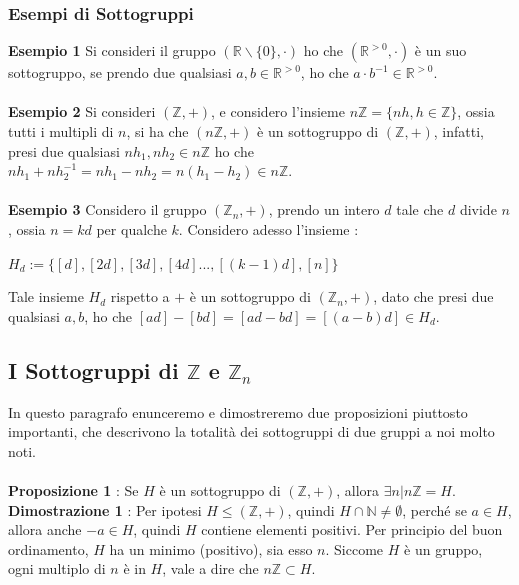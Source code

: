 \documentclass[12pt, letterpaper]{article}
\begin{document}
\subsubsection{Esempi di Sottogruppi}
\textbf{Esempio 1} Si consideri il gruppo \((\mathbb{R}\backslash\{0\},\cdot)\) ho che  \((\mathbb{R}^{>0},\cdot)\) è 
un suo sottogruppo, se prendo due qualsiasi \(a,b\in \mathbb{R}^{>0}\), ho che \(a\cdot b^{-1}\in \mathbb{R}^{>0}\).
\\\hphantom{}\\
\textbf{Esempio 2} Si consideri \((\mathbb{Z},+)\), e considero l'insieme \(n\mathbb{Z}=\{nh, h\in\mathbb{Z}\}\), ossia 
tutti i multipli di \(n\), si ha che \((n\mathbb{Z},+)\) è un sottogruppo di \((\mathbb{Z},+)\), infatti, 
presi due qualsiasi \(nh_1,nh_2\in n\mathbb{Z}\) ho che \(nh_1+nh_2^{-1}=nh_1-nh_2=n(h_1-h_2)\in n\mathbb{Z}\).
\\\hphantom{}\\
\textbf{Esempio 3} Considero il gruppo \((\mathbb{Z}_n,+)\), prendo un intero \(d\) tale che \(d\) divide 
\(n\), ossia \(n=kd\) per qualche \(k\). Considero adesso l'insieme :\begin{center}
    \(
        H_d := \{[d],[2d],[3d],[4d]...,[(k-1)d],[n]\}  
    \)
\end{center}
Tale insieme \(H_d\) rispetto a \(+\) è un sottogruppo di \((\mathbb{Z}_n,+)\), dato che presi due qualsiasi 
\(a,b\), ho che \([ad]-[bd]=[ad-bd]=[(a-b)d]\in H_d\).
\subsection{I Sottogruppi di \(\mathbb{Z}\) e \(\mathbb{Z}_n\)}
In questo paragrafo enunceremo e dimostreremo due proposizioni piuttosto importanti, che descrivono la totalità 
dei sottogruppi di due gruppi a noi molto noti.\\\hphantom{}\\
\textbf{Proposizione 1 } : Se \(H\) è un sottogruppo di \((\mathbb{Z},+)\), allora \(\exists n | n\mathbb{Z}=H\).
\\\textbf{Dimostrazione 1 } : Per ipotesi \(H\le(\mathbb{Z},+)\), quindi \(H\cap\mathbb{N}\ne \emptyset\), perché 
se \(a\in H\), allora anche \(-a\in H\), quindi \(H\) contiene elementi positivi. Per principio del buon ordinamento, 
\(H\) ha un minimo (positivo), sia esso \(n\). Siccome \(H\) è un gruppo, ogni multiplo di \(n\) è in \(H\),
vale a dire che \(n\mathbb{Z}\subset H\).
\end{document}
